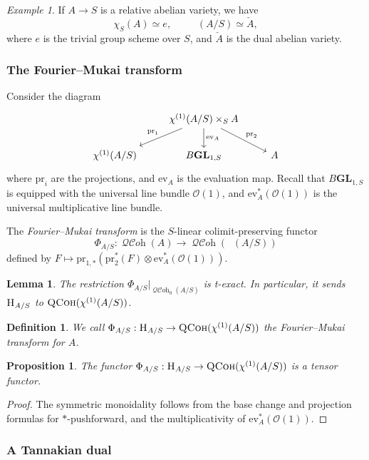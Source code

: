 \documentclass[12pt, oneside]{amsart}
\numberwithin{equation}{section}
\newtheorem{proposition}[subsubsection]{Proposition}
\newtheorem{definition}[subsubsection]{Definition}
\newtheorem{lemma}[subsubsection]{Lemma}
\theoremstyle{remark}
\newtheorem{example}[subsubsection]{Example}
\theoremstyle{plain}
\DeclareMathOperator{\QCoh}{\textsc{QCoh}}
\DeclareMathOperator{\QCOH}{\mathcal{QC}\textit{oh}}
\newcommand{\Hcat}{\textup{\textsc{H}}}
\newcommand{\HAS}{\Hcat_{A/S}}
\DeclareMathOperator{\CharOne}{\chi^{(1)}}
\newcommand{\OO}{\mathcal{O}}
\newcommand{\GL}{\mathbf{GL}}
\newcommand{\pr}{\mathrm{pr}}
\newcommand{\ev}{\mathrm{ev}}
\begin{document}
\begin{example}
If $A \to S$ is a relative abelian variety, we have
\[
  \chi_S(A) \simeq e,
  \qquad \CharOne(A/S) \simeq \check{A},
\]
where $e$ is the trivial group scheme over $S$, and $\check{A}$ is the dual abelian variety.
\end{example}

\subsubsection{The Fourier--Mukai transform}
\label{sssec:Phi}

Consider the diagram \[\begin{tikzcd}
  & \CharOne(A/S) \times_S {A} \ar[swap]{ld}{\pr_{1}}\ar{d}{\ev_A}\ar{rd}{\pr_{2}} &
  \\
  \CharOne(A/S) & B\GL_{1,S} & A
\end{tikzcd}\]
where $\pr_i$ are the projections, and $\ev_{A}$ is the evaluation map.
Recall that $B\GL_{1,S}$ is equipped with the universal line bundle $\OO(1)$, and $\ev_A^*(\OO(1))$ is the universal multiplicative line bundle.

The \emph{Fourier--Mukai transform} is the $S$-linear colimit-preserving functor
\[ \Phi_{A/S} : \QCOH(A) \to \QCOH(\CharOne(A/S)) \]
defined by $F \mapsto \pr_{1,*}(\pr_{2}^*(F) \otimes \ev_{A}^*(\OO(1)))$.

\begin{lemma}\label{lem:FM t-exact} The restriction $\Phi_{A/S}|_{\QCOH_0(A/S)}$ is t-exact. In particular, it sends $\HAS$ to $\QCoh(\CharOne(A/S))$.
\end{lemma}

\begin{definition}\label{def:FMA}
  We call $\Phi_{A/S} : \HAS \to \QCoh(\CharOne(A/S))$ the \emph{Fourier--Mukai transform} for $A$.
\end{definition}

\begin{proposition} The functor $\Phi_{A/S} : \HAS \to \QCoh(\CharOne(A/S))$ is a tensor functor. \end{proposition}
\begin{proof} The symmetric monoidality follows from the base change and projection formulas for $*$-pushforward, and the multiplicativity of $\ev_{A}^*(\OO(1))$. \end{proof}

\subsubsection{A Tannakian dual}
\label{sssec:Tannakian dual}
\end{document}
